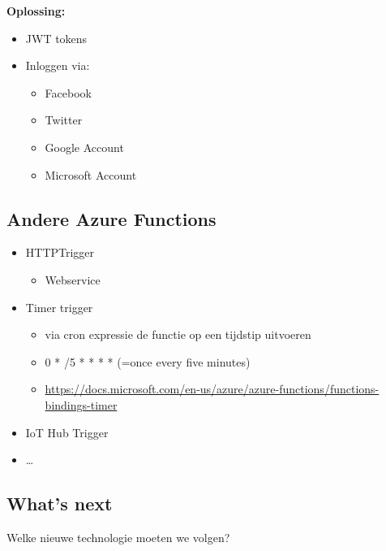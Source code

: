 \documentclass{article}
\newcommand{\bold}[1]{\textbf{#1}}
\begin{document}
\bold{Oplossing:}

\begin{itemize}
    \item JWT tokens
    \item Inloggen via:
    \begin{itemize}
        \item Facebook
        \item Twitter
        \item Google Account
        \item Microsoft Account
    \end{itemize}
\end{itemize}

\subsection{Andere Azure Functions}
\begin{itemize}
    \item HTTPTrigger
    \begin{itemize}
        \item Webservice
    \end{itemize}
    \item Timer trigger
    \begin{itemize}
        \item via cron expressie de functie op een tijdstip uitvoeren
        \item 0 * /5 * * * *  (=once every five minutes)
        \item \url{https://docs.microsoft.com/en-us/azure/azure-functions/functions-bindings-timer}
    \end{itemize}
    \item IoT Hub Trigger
    \item \dots
\end{itemize}

\subsection{What's next}
Welke nieuwe technologie moeten we volgen?
\end{document}
